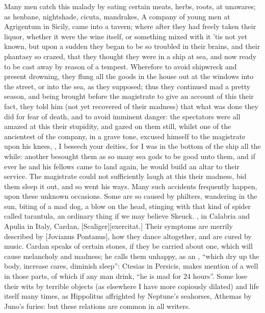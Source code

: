 Many men catch this malady by eating certain meats, herbs, roots, at unawares;
as henbane, nightshade, cicuta, mandrakes, \etc{} A
company of young men at Agrigentum in Sicily, came into a tavern; where after
they had freely taken their liquor, whether it were the wine itself, or
something mixed with it 'tis not yet known, but upon a
sudden they began to be so troubled in their brains, and their phantasy so
crazed, that they thought they were in a ship at sea, and now ready to be cast
away by reason of a tempest. Wherefore to avoid shipwreck and present drowning,
they flung all the goods in the house out at the windows into the street, or
into the sea, as they supposed; thus they continued mad a pretty season, and
being brought before the magistrate to give an account of this their fact, they
told him (not yet recovered of their madness) that what was done they did for
fear of death, and to avoid imminent danger: the spectators were all amazed at
this their stupidity, and gazed on them still, whilst one of the ancientest of
the company, in a grave tone, excused himself to the magistrate upon his knees,
, I beseech your deities, \etc{} for I
was in the bottom of the ship all the while: another besought them as so many
sea gods to be good unto them, and if ever he and his fellows came to land
again, he would build an altar to their service. The
magistrate could not sufficiently laugh at this their madness, bid them sleep
it out, and so went his ways. Many such accidents frequently happen, upon these
unknown occasions. Some are so caused by philters, wandering in the sun, biting
of a mad dog, a blow on the head, stinging with that kind of spider called
tarantula, an ordinary thing if we may believe Skeuck. , in Calabria and Apulia in Italy, Cardan,
 [Scaliger][\textlatin{exercitat.}]  Their symptoms are merrily described by [Jovianus Pontanus],
 how they dance altogether, and are cured by
music. Cardan speaks of certain stones, if they be carried
about one, which will cause melancholy and madness; he calls them unhappy, as
an , \etc{} \enquote{which dry up the body,
increase cares, diminish sleep}: Ctesias in Persicis, makes mention of a well
in those parts, of which if any man drink, \enquote{he is mad for
24 hours}. Some lose their wits by terrible objects (as elsewhere I have more
copiously dilated) and life itself many times, as
Hippolitus affrighted by Neptune's seahorses, Athemas by Juno's furies: but
these relations are common in all writers.

